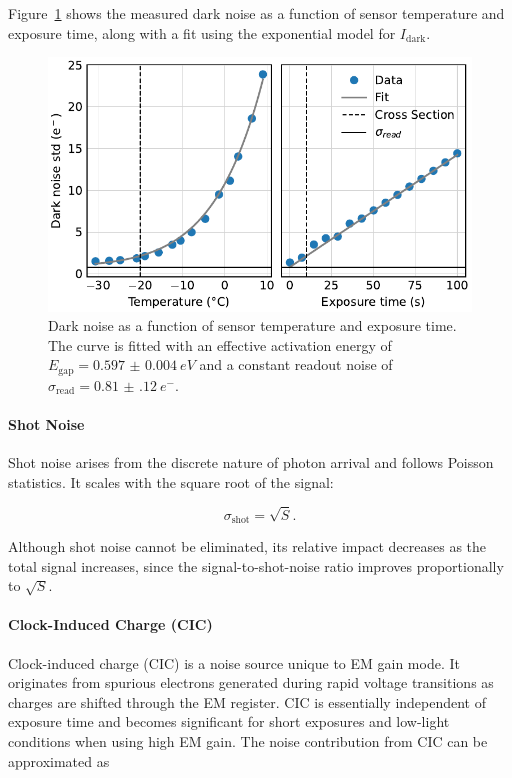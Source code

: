 \documentclass[
	parskip=half,
	a4paper,
]{scrarticle}
\begin{document}
Figure~\ref{fig:dark_noise} shows the measured dark noise as a function of sensor temperature and exposure time, along with a fit using the exponential model for $I_{\text{dark}}$.

\begin{figure}
    \centering
    \includegraphics{../analysis/figures/dark_noise.pdf}
    \caption{Dark noise as a function of sensor temperature and exposure time. The curve is fitted with an effective activation energy of $E_\text{gap} = \SI{0.597(4)}{eV}$ and a constant readout noise of $\sigma_{\text{read}} = \SI{0.81(12)}{e^-}$.}
    \label{fig:dark_noise}
\end{figure}

\paragraph{Shot Noise}

Shot noise arises from the discrete nature of photon arrival and follows Poisson statistics. It scales with the square root of the signal:

\begin{equation}
    \sigma_{\text{shot}} = \sqrt{S}.
\end{equation}

Although shot noise cannot be eliminated, its relative impact decreases as the total signal increases, since the signal-to-shot-noise ratio improves proportionally to $\sqrt{S}$.

\paragraph{Clock-Induced Charge (CIC)}

Clock-induced charge (CIC) is a noise source unique to EM gain mode. It originates from spurious electrons generated during rapid voltage transitions as charges are shifted through the EM register. CIC is essentially independent of exposure time and becomes significant for short exposures and low-light conditions when using high EM gain. The noise contribution from CIC can be approximated as
\end{document}
